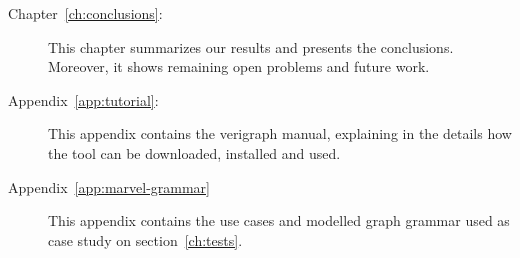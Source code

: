 \begin{description}
  \item[Chapter~\ref{ch:conclusions}:] This chapter summarizes our results and presents the conclusions. Moreover, it shows remaining open problems and future work.

  \item[Appendix~\ref{app:tutorial}:] This appendix contains the verigraph manual, explaining in the details how the tool can be downloaded, installed and used.

  \item[Appendix~\ref{app:marvel-grammar}] This appendix contains the use cases and modelled graph grammar used as case study on section~\ref{ch:tests}.
\end{description}
